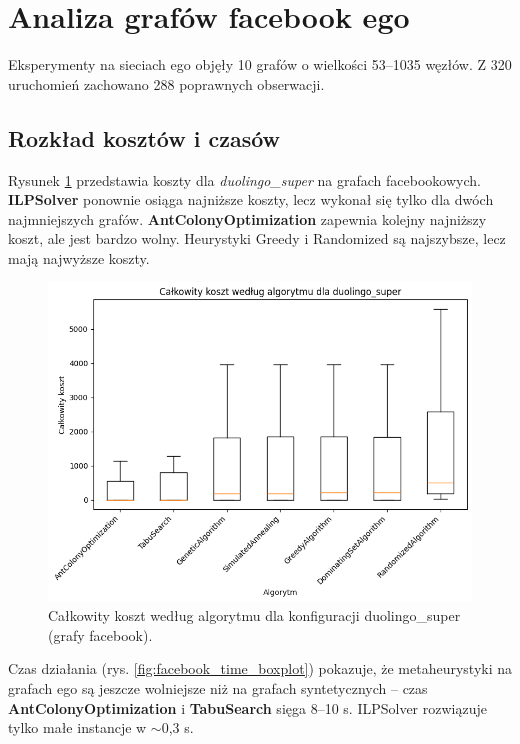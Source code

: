 \section{Analiza grafów facebook ego}

Eksperymenty na sieciach ego objęły 10 grafów o wielkości 53--1035 węzłów. Z 320 uruchomień zachowano 288 poprawnych obserwacji.

\subsection{Rozkład kosztów i czasów}

Rysunek \ref{fig:facebook_cost_boxplot} przedstawia koszty dla \emph{duolingo\_super} na grafach facebookowych. \textbf{ILPSolver} ponownie osiąga najniższe koszty, lecz wykonał się tylko dla dwóch najmniejszych grafów. \textbf{AntColonyOptimization} zapewnia kolejny najniższy koszt, ale jest bardzo wolny. Heurystyki Greedy i Randomized są najszybsze, lecz mają najwyższe koszty.

\begin{figure}[H]
  \centering
  \includegraphics[width=0.7\linewidth]{assets/figures/facebook_cost_boxplot.png}
  \caption{Całkowity koszt według algorytmu dla konfiguracji duolingo\_super (grafy facebook).}
  \label{fig:facebook_cost_boxplot}
\end{figure}

Czas działania (rys. \ref{fig:facebook_time_boxplot}) pokazuje, że metaheurystyki na grafach ego są jeszcze wolniejsze niż na grafach syntetycznych -- czas \textbf{AntColonyOptimization} i \textbf{TabuSearch} sięga 8--10 s. ILPSolver rozwiązuje tylko małe instancje w $\sim$0,3 s.

